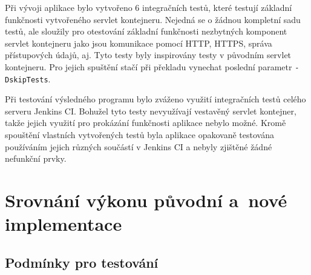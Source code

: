     \medskip
    Při vývoji aplikace bylo vytvořeno 6 integračních testů, které testují základní funkčnosti
    vytvořeného servlet kontejneru. Nejedná se o žádnou kompletní sadu testů, ale sloužily pro
    otestování základní funkčnosti nezbytných komponent servlet kontejneru jako jsou
    komunikace pomocí HTTP, HTTPS, správa přístupových údajů, aj. Tyto testy byly inspirovány
    testy v původním servlet kontejneru. Pro jejich spuštění stačí při překladu vynechat poslední
    parametr \texttt{-DskipTests}.

    Při testování výsledného programu bylo zváženo využití integračních testů celého serveru Jenkins CI.
    Bohužel tyto testy nevyužívají vestavěný servlet kontejner, takže jejich využití
    pro prokázání funkčnosti aplikace nebylo možné.
    Kromě spouštění vlastních vytvořených testů byla aplikace opakovaně testována používáním jejich různých součástí
    v Jenkins CI
    a nebyly zjištěné žádné nefunkční prvky.

    


\chapter{Srovnání výkonu původní a~nové implementace}  \label{kapPerformance}

    \section{Podmínky pro testování}



